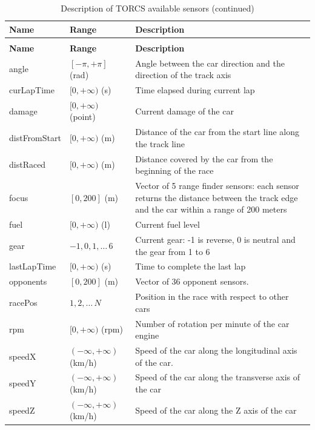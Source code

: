 \documentclass[Lau,oneside,noexaminfo]{sapthesis} %
\begin{document}
\begin{longtable}{p{}p{}p{}}
\caption{Description of TORCS available sensors}\\
\toprule
\textbf{Name}          & \textbf{Range}            & \textbf{Description}    \\
\midrule
\endfirsthead
\caption{Description of TORCS available sensors (continued)}\\
\toprule
\textbf{Name}          & \textbf{Range}            & \textbf{Description}    \\
\midrule
\endhead
\bottomrule
\endfoot
angle         & $[-\pi, +\pi]$ (rad)  & Angle between the car direction and the direction of the track axis      \\
curLapTime    & $[0, +\infty)$ (s)      & Time elapsed during current lap    \\
damage        & $[0, +\infty)$ (point)  & Current damage of the car    \\
distFromStart & $[0, +\infty)$ (m)      & Distance of the car from the start line along the track line             \\
distRaced     & $[0, +\infty)$ (m)       & Distance covered by the car from the beginning of the race \\
focus         & $[0, 200]$ (m)      & Vector of 5 range finder sensors: each sensor returns the distance between the track edge and the car within a range of 200 meters   \\
fuel          & $[0, +\infty)$ (l)       & Current fuel level           \\
gear          & ${-1, 0, 1, \dots\, 6}$ & Current gear: -1 is reverse, 0 is neutral and the gear from 1 to 6       \\
lastLapTime   & $[0, +\infty)$ (s)       & Time to complete the last lap\\
opponents     & $[0, 200]$ (m)      & Vector of 36 opponent sensors.     \\
racePos       & ${1, 2, \dots\, N}$    & Position in the race with respect to other cars  \\
rpm           & $[0, +\infty)$ (rpm)     & Number of rotation per minute of the car engine  \\
speedX        & $(-\infty, +\infty)$ (km/h)   & Speed of the car along the longitudinal axis of the car.   \\
speedY        & $(-\infty, +\infty)$ (km/h)   & Speed of the car along the transverse axis of the car\\
speedZ        & $(-\infty, +\infty)$ (km/h)   & Speed of the car along the Z axis of the car     \\

\end{longtable}
\end{document}

